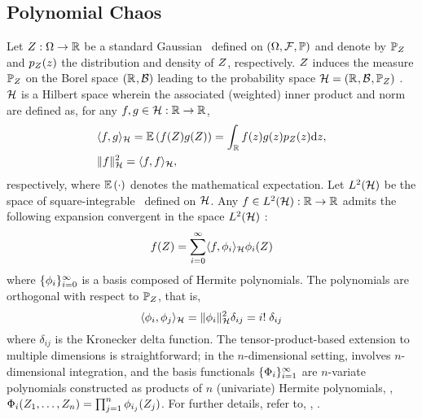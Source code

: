 \subsection{Polynomial Chaos}
Let $Z: \Omega \to \mathbb{R}$ be a standard Gaussian \rv\ defined on $(\Omega, \mathcal{F}, \mathbb{P})$ and denote by $\mathbb{P}_Z$ and $\f{\Z}{\z}$ the distribution and density of $Z$, respectively. $Z$ induces the measure $\mathbb{P}_Z$ on the Borel space $(\mathbb{R}^{}, \mathcal{B})$ leading to the probability space $\mathcal{H} = (\mathbb{R}^{}, \mathcal{B}^{}, \mathbb{P}_Z)$ \cite{durrett2010}. $\mathcal{H}$ is a Hilbert space wherein the associated (weighted) inner product and norm are defined as, for any $f, g \in \mathcal{H}: \mathbb{R} \to \mathbb{R}$,
\begin{align}
  & \iprod{f, g}_\hilbertSpace = \E{f(\Z) g(\Z)} = \int_\real f(\z) g(\z) \f{\Z}{\z} \d\z, \elabel{inner-product} \\
  & \norm{f}_\hilbertSpace^2 = \iprod{f, f}_\hilbertSpace \nonumber,
\end{align}
respectively, where $\mathbb{E}\left( \cdot \right)$ denotes the mathematical expectation. Let $L^{2}(\mathcal{H})$ be the space of square-integrable \rvs\ defined on $\mathcal{H}$. Any $f \in L^{2}(\mathcal{H}): \mathbb{R} \to \mathbb{R}$ admits the following expansion convergent in the space $L^{2}(\mathcal{H})$ \cite{maitre2010}:
\[
  f(Z) = \sum_{i = 0}^\infty \langle f, \phi_i \rangle_{\mathcal{H}} \phi_i(Z)
\]
where $\{ \phi_i \}_{i = 0}^\infty$ is a basis composed of Hermite polynomials. The polynomials are orthogonal with respect to $\mathbb{P}_Z$, that is,
\[
  \langle \phi_i, \phi_j \rangle_{\mathcal{H}} = \| \phi_i \|_{\mathcal{H}}^2 \delta_{ij} = i! \; \delta_{ij}
\]
where $\delta_{ij}$ is the Kronecker delta function. The tensor-product-based extension to multiple dimensions is straightforward; in the $n$-dimensional setting,  involves $n$-dimensional integration, and the basis functionals $\{ \Phi_i \}_{i = 1}^\infty$ are $n$-variate polynomials constructed as products of $n$ (univariate) Hermite polynomials, \ie, $\Phi_i(Z_1, \dotsc, Z_n) = \prod_{j = 1}^n \phi_{i_j}(Z_j)$. For further details, refer to, \eg, \cite{maitre2010}.

